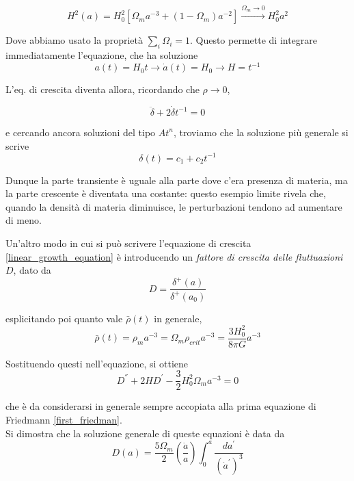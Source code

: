 \documentclass{report}
\begin{document}
\begin{equation}
    H^2(a) = H_0^2[\Omega_ma^{-3} + (1- \Omega_m)a^{-2}] \xrightarrow{\Omega_m \rightarrow 0} H_0^2a^2
\end{equation}

Dove abbiamo usato la proprietà $\sum_i \Omega_i = 1$. Questo permette di integrare immediatamente l'equazione, che ha soluzione 
\begin{equation}
    a(t) = H_0t \rightarrow \dot{a}(t) = H_0 \rightarrow H = t^{-1}
\end{equation}

L'eq. di crescita diventa allora, ricordando che $\rho \rightarrow 0$, 

\begin{equation}
    \ddot{\delta} + 2\dot{\delta}t^{-1} = 0 
\end{equation}

e cercando ancora soluzioni del tipo $At^n$, troviamo che la soluzione più generale si scrive 
\begin{equation}
    \delta(t) = c_1 + c_2t^{-1}
\end{equation}

Dunque la parte transiente è uguale alla parte dove c'era presenza di materia, ma la parte crescente è diventata una costante: questo esempio limite rivela che, quando la densità di materia diminuisce, le perturbazioni tendono ad aumentare di meno. 

Un'altro modo in cui si può scrivere l'equazione di crescita \ref{linear_growth_equation} è introducendo un \emph{fattore di crescita delle fluttuazioni}  $D$, dato da 
\begin{equation}
    D = \frac{\delta^{+}(a)}{\delta^{+}(a_0)}
\end{equation}

esplicitando poi quanto vale $\bar{\rho}(t)$ in generale, 
\begin{equation}
    \bar{\rho}(t) = \rho_ma^{-3} = \Omega_m\rho_{crit}a^{-3} = \frac{3H_0^2}{8\pi G}a^{-3}
\end{equation}

Sostituendo questi nell'equazione, si ottiene 
\begin{equation}
    D^{''} + 2HD^{'} - \frac{3}{2}H_0^2\Omega_ma^{-3} = 0
\end{equation}

che è da considerarsi in generale sempre accopiata alla prima equazione di Friedmann \ref{first_friedman}. \\
Si dimostra che la soluzione generale di queste equazioni è data da 
\begin{equation}
    D(a) = \frac{5\Omega_m}{2}\left(\frac{\dot{a}}{a}\right)\int_0^a\frac{da^{'}}{(\dot{a}^{'})^3}
\end{equation}
\end{document}
